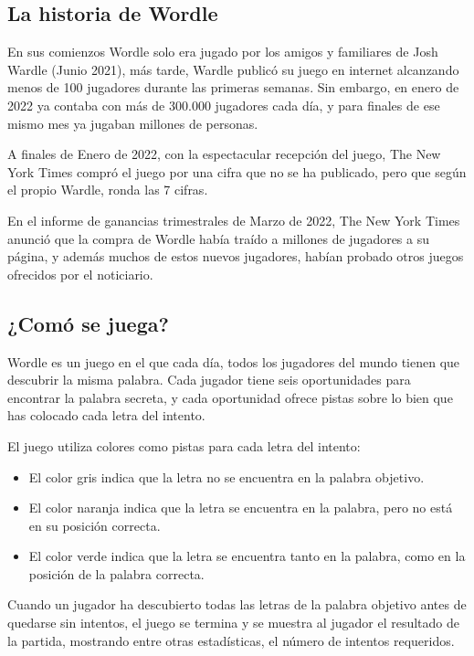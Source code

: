 \subsection{La historia de Wordle}

En sus comienzos Wordle solo era jugado por los amigos y familiares de Josh Wardle (Junio 2021), más tarde, Wardle publicó su juego en internet alcanzando menos de 100 jugadores durante las primeras semanas. Sin embargo, en enero de 2022 ya contaba con más de 300.000 jugadores cada día, y para finales de ese mismo mes ya jugaban millones de personas.

A finales de Enero de 2022, con la espectacular recepción del juego, The New York Times compró el juego por una cifra que no se ha publicado, pero que según el propio Wardle, ronda las 7 cifras.

En el informe de ganancias trimestrales de Marzo de 2022, The New York Times anunció que la compra de Wordle había traído a millones de jugadores a su página, y además muchos de estos nuevos jugadores, habían probado otros juegos ofrecidos por el noticiario.


\subsection{¿Comó se juega?}

Wordle es un juego en el que cada día, todos los jugadores del mundo tienen que descubrir la misma palabra.
Cada jugador tiene seis oportunidades para encontrar la palabra secreta, y cada oportunidad ofrece pistas sobre lo bien que has colocado cada letra del intento.

El juego utiliza colores como pistas para cada letra del intento:
\begin{itemize}
	\item El color gris indica que la letra no se encuentra en la palabra objetivo.
	\item El color naranja indica que la letra se encuentra en la palabra, pero no está en su posición correcta.
	\item El color verde indica que la letra se encuentra tanto en la palabra, como en la posición de la palabra correcta.
\end{itemize}

Cuando un jugador ha descubierto todas las letras de la palabra objetivo antes de quedarse sin intentos, el juego se termina y se muestra al jugador el resultado de la partida, mostrando entre otras estadísticas, el número de intentos requeridos.

